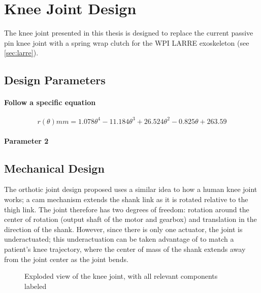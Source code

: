 \chapter{Knee Joint Design}

The knee joint presented in this thesis is designed to replace the current passive pin knee joint with a spring wrap clutch for the WPI LARRE exoskeleton (see \autoref{sec:larre}).


\section{Design Parameters}

\subsubsection{Follow a specific equation}

\begin{equation}
    r(\theta) mm = 1.078\theta^4 - 11.184\theta^3 + 26.524\theta^2 - 0.825\theta + 263.59
    \label{eq:KneeJointGeometryEquation}
\end{equation}

\subsubsection{Parameter 2}


\section{Mechanical Design}

The orthotic joint design proposed uses a similar idea to how a human knee joint works; a cam mechanism  extends the shank link as it is rotated relative to the thigh link. The joint therefore has two degrees of freedom: rotation around the center of rotation (output shaft of the motor and gearbox) and translation in the direction of the shank. However, since there is only one actuator, the joint is underactuated; this underactuation can be taken advantage of to match a patient's knee trajectory, where the center of mass of the shank extends away from the joint center as the joint bends.

\begin{figure} [ht!]
    \centering
    \caption{Exploded view of the knee joint, with all relevant components labeled}
    \label{fig:KneeJointExplodedView}
\end{figure}

